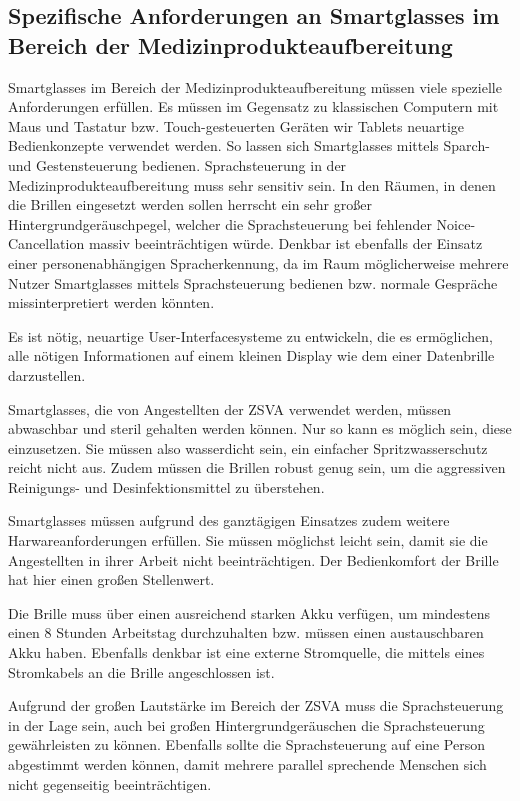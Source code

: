 \subsection{Spezifische Anforderungen an Smartglasses im Bereich der Medizinprodukteaufbereitung}
\label{sec:Spezifische_Anforderungen_an_Smartglasses}
Smartglasses im Bereich der Medizinprodukteaufbereitung müssen viele spezielle Anforderungen erfüllen. Es müssen im Gegensatz zu klassischen Computern mit Maus und Tastatur bzw. Touch-gesteuerten Geräten wir Tablets neuartige Bedienkonzepte verwendet werden. So lassen sich Smartglasses mittels Sparch- und Gestensteuerung bedienen.
Sprachsteuerung in der Medizinprodukteaufbereitung muss sehr sensitiv sein. In den Räumen, in denen die Brillen eingesetzt werden sollen herrscht ein sehr großer Hintergrundgeräuschpegel, welcher die Sprachsteuerung bei fehlender Noice-Cancellation massiv beeinträchtigen würde. Denkbar ist ebenfalls der Einsatz einer personenabhängigen Spracherkennung, da im Raum möglicherweise mehrere Nutzer Smartglasses mittels Sprachsteuerung bedienen bzw. normale Gespräche missinterpretiert werden könnten. 

Es ist nötig, neuartige User-Interfacesysteme zu entwickeln, die es ermöglichen, alle nötigen Informationen auf einem kleinen Display wie dem einer Datenbrille darzustellen. 

Smartglasses, die von Angestellten der ZSVA verwendet werden, müssen abwaschbar und steril gehalten werden können. Nur so kann es möglich sein, diese einzusetzen. Sie müssen also wasserdicht sein, ein einfacher Spritzwasserschutz reicht nicht aus. Zudem müssen die Brillen robust genug sein, um die aggressiven Reinigungs- und Desinfektionsmittel zu überstehen.

Smartglasses müssen aufgrund des ganztägigen Einsatzes zudem weitere Harwareanforderungen erfüllen. Sie müssen möglichst leicht sein, damit sie die Angestellten in ihrer Arbeit nicht beeinträchtigen. Der Bedienkomfort der Brille hat hier einen großen Stellenwert. 

Die Brille muss über einen ausreichend starken Akku verfügen, um mindestens einen 8 Stunden Arbeitstag durchzuhalten bzw. müssen einen austauschbaren Akku haben. Ebenfalls denkbar ist eine externe Stromquelle, die mittels eines Stromkabels an die Brille angeschlossen ist.

Aufgrund der großen Lautstärke im Bereich der ZSVA muss die Sprachsteuerung in der Lage sein, auch bei großen Hintergrundgeräuschen die Sprachsteuerung gewährleisten zu können. Ebenfalls sollte die Sprachsteuerung auf eine Person abgestimmt werden können, damit mehrere parallel sprechende Menschen sich nicht gegenseitig beeinträchtigen.

